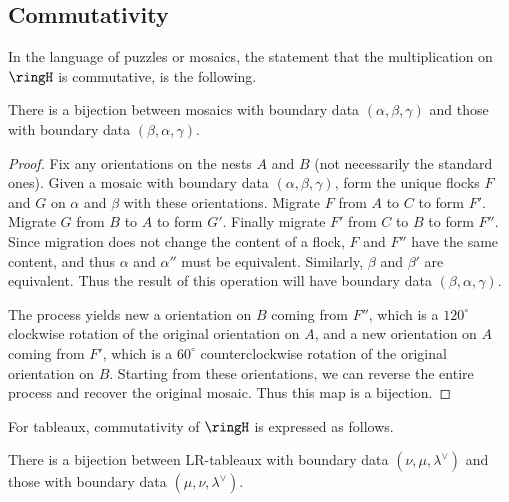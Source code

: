 
\subsection{Commutativity}
In the language of puzzles or mosaics, the statement that the 
multiplication on $\ringH$ is commutative, is the following.

\begin{corollary}
\label{cor:mosaiccommute}
There is a bijection between mosaics with boundary data
$(\alpha, \beta, \gamma)$ and those with boundary data
$(\beta, \alpha, \gamma)$.
\end{corollary}

\begin{proof}
Fix any orientations on the nests $A$ and $B$ (not necessarily the
standard ones).  Given a mosaic with boundary data 
$(\alpha, \beta, \gamma)$, form the unique flocks $F$ and
$G$ on $\alpha$ and $\beta$ 
with these orientations.  Migrate
$F$ from $A$ to $C$ to form $F'$.  Migrate $G$ from
$B$ to $A$ to form $G'$.  Finally migrate $F'$ from $C$ to $B$ to
form $F''$.  Since migration does not change the content of
a flock, $F$ and $F''$ have the same content, and thus
$\alpha$ and $\alpha''$ must be equivalent.  Similarly, $\beta$ and 
$\beta'$ are equivalent.  Thus the result of this operation will
have boundary data $(\beta, \alpha, \gamma)$.

The process yields new a orientation on $B$ coming from $F''$,
which is a $120^\circ$ clockwise rotation of the original orientation 
on $A$, and a new orientation on $A$ coming from $F'$, which is
a $60^\circ$ counterclockwise rotation of the original orientation on $B$.
Starting from these orientations, we can reverse the entire process
and recover the original mosaic.  Thus this map is a bijection.
\end{proof}

For tableaux, commutativity of $\ringH$ is expressed as follows.

\begin{corollary}
\label{cor:tableaucommute}
There is a bijection between LR-tableaux with boundary data 
$(\nu, \mu, \lambda^\vee)$ and those with boundary data
$(\mu, \nu, \lambda^\vee)$.
\end{corollary}

